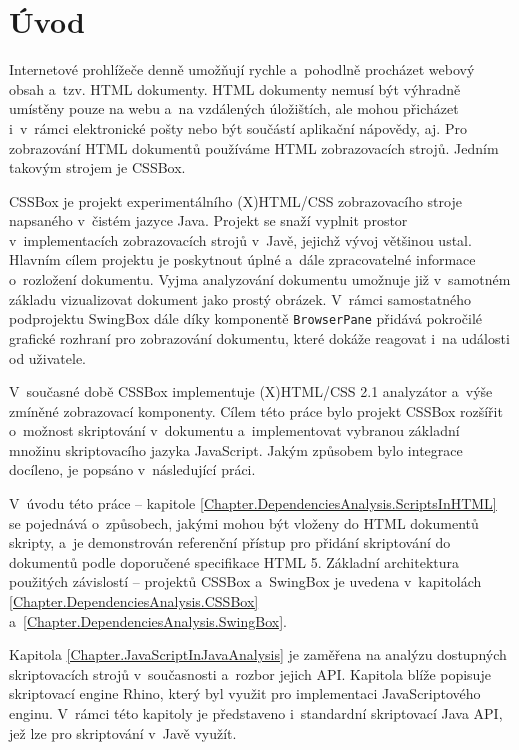 
\chapter{Úvod}
\label{Chapter.Introducion}

Internetové prohlížeče denně umožňují rychle a~pohodlně procházet webový obsah a~tzv. HTML dokumenty. HTML dokumenty nemusí být výhradně umístěny pouze na webu a~na vzdálených úložištích, ale mohou přicházet i~v~rámci elektronické pošty nebo být součástí aplikační nápovědy, aj. Pro zobrazování HTML dokumentů používáme HTML zobrazovacích strojů. Jedním takovým strojem je CSSBox.

CSSBox je projekt experimentálního (X)HTML/CSS zobrazovacího stroje napsaného v~čistém jazyce Java. Projekt se snaží vyplnit prostor v~implementacích zobrazovacích strojů v~Javě, jejichž vývoj většinou ustal. Hlavním cílem projektu je poskytnout úplné a~dále zpracovatelné informace o~rozložení dokumentu. Vyjma analyzování dokumentu umožnuje již v~samotném základu vizualizovat dokument jako prostý obrázek. V~rámci samostatného podprojektu SwingBox dále díky komponentě \texttt{BrowserPane} přidává pokročilé grafické rozhraní pro zobrazování dokumentu, které dokáže reagovat i~na události od uživatele.

V~současné době CSSBox implementuje (X)HTML/CSS 2.1 analyzátor a~výše zmíněné zobrazovací komponenty. Cílem této práce bylo projekt CSSBox rozšířit o~možnost skriptování v~dokumentu a~implementovat vybranou základní množinu skriptovacího jazyka JavaScript. Jakým způsobem bylo integrace docíleno, je popsáno v~následující práci.

V~úvodu této práce -- kapitole \ref{Chapter.DependenciesAnalysis.ScriptsInHTML} se pojednává o~způsobech, jakými mohou být vloženy do HTML dokumentů skripty, a~je demonstrován referenční přístup pro přidání skriptování do dokumentů podle doporučené specifikace HTML 5. Základní architektura použitých závislostí -- projektů CSSBox a~SwingBox je uvedena v~kapitolách \ref{Chapter.DependenciesAnalysis.CSSBox} a~\ref{Chapter.DependenciesAnalysis.SwingBox}.

Kapitola \ref{Chapter.JavaScriptInJavaAnalysis} je zaměřena na analýzu dostupných skriptovacích strojů v~současnosti a~rozbor jejich API. Kapitola blíže popisuje skriptovací engine Rhino, který byl využit pro implementaci JavaScriptového enginu. V~rámci této kapitoly je představeno i~standardní skriptovací Java API, jež lze pro skriptování v~Javě využít.

